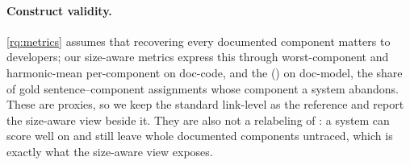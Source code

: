 \paragraph{Construct validity.}
\ref{rq:metrics} assumes that recovering every documented component matters to developers; our size-aware metrics express this through worst-component and harmonic-mean per-component \fone{} on doc-code, and the \cmrname{} (\cmr) on doc-model, the share of gold sentence--component assignments whose component a system abandons.
These are proxies, so we keep the standard link-level \fone{} as the reference and report the size-aware view beside it.
They are also not a relabeling of \fone{}: a system can score well on \fone{} and still leave whole documented components untraced, which is exactly what the size-aware view exposes.
